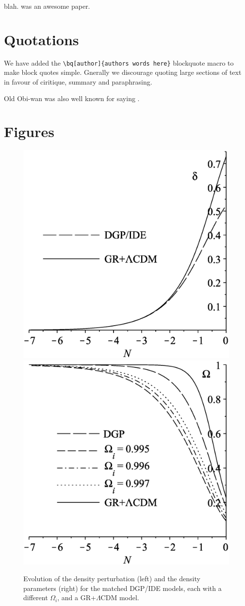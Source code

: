 \textcite{dennisiui} blah. \textcite{ruta2018websight} was an awesome paper.

\section{Quotations}
\label{intro:quotations}
We have added the \verb|\bq[author]{authors words here}| blockquote macro to make block quotes simple.  Gnerally we discourage quoting large sections of text in favour of ciritique, summary and paraphrasing.


Old Obi-wan was also well known for saying . 

\section{Figures}
\label{intro:figures}

\begin{figure}
\includegraphics[width=0.49\columnwidth]{figures/dgpdeltas.eps}
\includegraphics[width=0.49\columnwidth]{figures/dgpomegas.eps}
\caption[Evolutions of $\delta$ and $\Omega$ for DGP]{Evolution of the density perturbation (left) and the density parameters (right) for the matched DGP/IDE models, each with a different $\Omega_i$,
and a GR+$\Lambda$CDM model.
\label{fig:matched}}
\end{figure}

